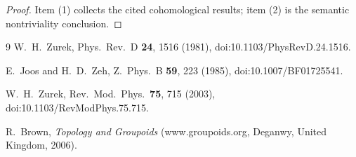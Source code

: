 \documentclass[aps,prl,reprint]{revtex4-2}
\theoremstyle{definition}
\theoremstyle{plain}
\begin{document}
\begin{proof}
Item (1) collects the cited cohomological results; item (2) is the semantic
nontriviality conclusion.
\end{proof}

\begin{thebibliography}{9}
W.~H.~Zurek, Phys.\ Rev.\ D \textbf{24}, 1516 (1981), doi:10.1103/PhysRevD.24.1516.

E.~Joos and H.~D.~Zeh, Z.\ Phys.\ B \textbf{59}, 223 (1985), doi:10.1007/BF01725541.

W.~H.~Zurek, Rev.\ Mod.\ Phys.\ \textbf{75}, 715 (2003), doi:10.1103/RevModPhys.75.715.

R.~Brown, \emph{Topology and Groupoids} (www.groupoids.org, Deganwy, United Kingdom, 2006).
\end{thebibliography}
\end{document}
